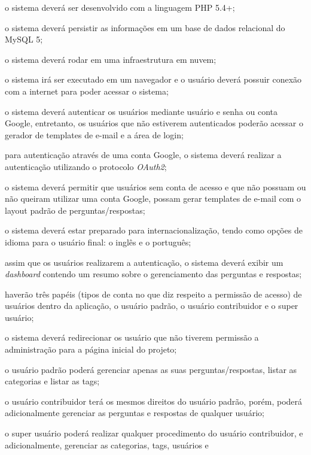 \begin{alineas}
	\item o sistema deverá ser desenvolvido com a linguagem PHP 5.4+;
	\item o sistema deverá persistir as informações em um base de dados relacional
	do MySQL 5;
	\item o sistema deverá rodar em uma infraestrutura em nuvem;
	\item o sistema irá ser executado em um navegador e o usuário deverá possuir
	conexão com a internet para poder acessar o sistema;
	\item o sistema deverá autenticar os usuários mediante usuário e senha ou
	conta Google, entretanto, os usuários que não estiverem autenticados poderão
	acessar o gerador de templates de e-mail e a área de login;
	\item para autenticação através de uma conta Google, o sistema deverá realizar
	a autenticação utilizando o protocolo \textit{OAuth2};
	\item o sistema deverá permitir que usuários sem conta de acesso e que não
	possuam ou não queiram utilizar uma conta Google, possam gerar templates de
	e-mail com o layout padrão de perguntas/respostas;
    \item o sistema deverá estar preparado para internacionalização, tendo como
    opções de idioma para o usuário final: o inglês e o português;
    \item assim que os usuários realizarem a autenticação, o sistema deverá
    exibir um \textit{dashboard} contendo um resumo sobre o gerenciamento das
    perguntas e respostas;
    \item haverão três papéis (tipos de conta no que diz respeito a permissão
    de acesso) de usuários dentro da aplicação, o usuário padrão, o usuário
    contribuidor e o super usuário;
    \item o sistema deverá redirecionar os usuário que não tiverem permissão a
    administração para a página inicial do projeto;
    \item o usuário padrão poderá gerenciar apenas as suas perguntas/respostas,
    listar as categorias e listar as tags;
    \item o usuário contribuidor terá os mesmos direitos do usuário padrão,
    porém, poderá adicionalmente gerenciar as perguntas e respostas de qualquer
    usuário;
    \item o super usuário poderá realizar qualquer procedimento do usuário
    contribuidor, e adicionalmente, gerenciar as categorias, tags, usuários e

\end{alineas}
